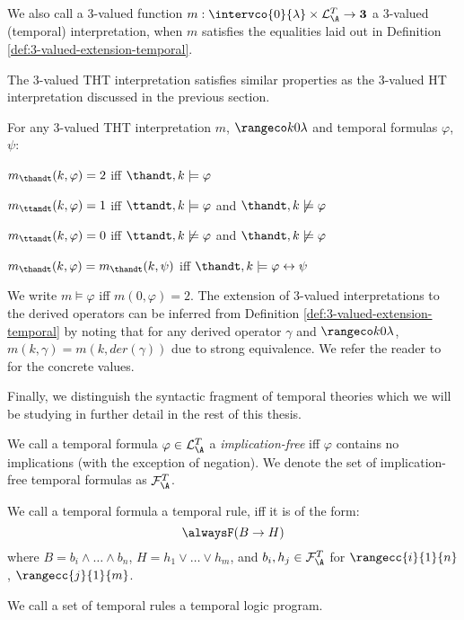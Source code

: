 We also call a 3-valued function
$m: \intervco{0}{\lambda} \times \mathcal{L}_{\A}^{T} \rightarrow
\textbf{3}$ a 3-valued (temporal) interpretation, when $m$ satisfies
the equalities laid out in Definition
\ref{def:3-valued-extension-temporal}.

The 3-valued THT interpretation satisfies similar properties as the
3-valued HT interpretation discussed in the previous section.

\begin{proposition}\label{prop:3-valued-temporal-properties}
  For any 3-valued THT interpretation $m$, $\kinlambda$ and temporal
  formulas $\varphi$, $\psi$:
\begin{description}
\item $m_{\thandt}(k,\varphi) = 2$ iff $\thandt,k \models \varphi$
\item $m_{\ttandt}(k,\varphi) = 1$ iff $\ttandt,k \models \varphi$ and $\thandt,k \not\models \varphi$
  \item $m_{\ttandt}(k,\varphi) = 0$ iff $\ttandt,k \not\models \varphi$ and $\thandt,k \not\models \varphi$
\item $m_{\thandt}(k,\varphi) = m_{\thandt}(k,\psi)$ iff $\thandt,k \models \varphi \leftrightarrow \psi$
\end{description}
\end{proposition}

We write $m \models \varphi$ iff $m(0,\varphi)=2$. The extension of
3-valued interpretations to the derived operators can be inferred from
Definition \ref{def:3-valued-extension-temporal} by noting that for
any derived operator $\gamma$ and $\kinlambda$,
$m(k,\gamma)=m(k,der(\gamma))$ due to strong equivalence. We refer the
reader to \cite{agcadipescscvi20a} for the concrete values.

Finally, we distinguish the syntactic fragment of temporal theories
which we will be studying in further detail in the rest of this thesis.

\begin{definition}
  We call a temporal formula $\varphi \in \mathcal{L}_{\A}^{T}$ a
  \emph{implication-free} iff $\varphi$ contains no implications (with
  the exception of negation). We denote the set of implication-free
  temporal formulas as $\mathcal{F}_{\A}^{T}$.
  
  We call a temporal formula a temporal rule, iff it is of the form:
  $$
  \tempruleshort
  $$
  where $B=b_i \land \dots \land b_n$, $H=h_1 \lor \dots \lor h_m$,
  and $b_i,h_j \in \mathcal{F}_{\A}^{T}$ for $\rangecc{i}{1}{n}$,
  $\rangecc{j}{1}{m}$.  

  We call a set of temporal rules a temporal logic program.
\end{definition}
